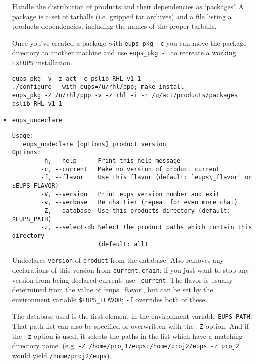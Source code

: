 \documentclass{article}
\newcommand{\code}[1]{\texttt{#1}}
\newcommand{\eups}{\code{ExtUPS}}
\begin{document}
\begin{itemize}
Handle the distribution of products and their dependencies as `packages'. A
package is a set of tarballs (i.e. gzipped tar archives) and a file listing
a products dependencies, including the names of the proper tarballs.

Once you've created a package with \code{eups\_pkg -c} you can move the
package directory to another machine and use \code{eups\_pkg -i} to
recreate a working \eups{} installation.

\begin{verbatim}
eups_pkg -v -z act -c pslib RHL_v1_1
./configure --with-eups=/u/rhl/ppp; make install
eups_pkg -Z /u/rhl/ppp -v -z rhl -i -r /u/act/products/packages pslib RHL_v1_1
\end{verbatim}
  

  \item \code{eups\_undeclare}
\begin{verbatim}
Usage:
   eups_undeclare [options] product version
Options:
        -h, --help      Print this help message
        -c, --current   Make no version of product current
        -f, --flavor    Use this flavor (default: `eups\_flavor` or $EUPS_FLAVOR)
        -V, --version   Print eups version number and exit
        -v, --verbose   Be chattier (repeat for even more chat)
        -Z, --database  Use this products directory (default: $EUPS_PATH)
        -z, --select-db Select the product paths which contain this directory 
                        (default: all)
\end{verbatim}
  
Undeclares \code{version} of \code{product} from the database. Also
removes any declarations of this version from \code{current.chain}; if
you just want to stop any version from being declared current, use
\code{--current}. The flavor is usually determined from the value
of `eups\_flavor`, but can be set by the
environment variable \code{\$EUPS\_FLAVOR}; \code{-f} overrides
both of these.

The database used is the first element in the environment
variable \code{EUPS\_PATH}. That path list can also be specified or
overwritten with the \code{-Z} option. And if the \code{-z} option is
used, it selects the paths in the list which have a matching directory
name. (e.g. \code{-Z /home/proj1/eups:/home/proj2/eups -z proj2} would
yield \code{/home/proj2/eups}).



\end{itemize}
\end{document}
